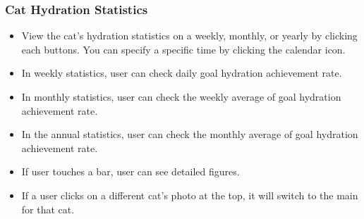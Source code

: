 \documentclass[conference]{IEEEtran}
\begin{document}
\subsubsection{Cat Hydration Statistics}
\begin{itemize}
    \begin{itemize}
        \item View the cat's hydration statistics on a weekly, monthly, or yearly by clicking each buttons. You can specify a specific time by clicking the calendar icon.
        \item In weekly statistics, user can check daily goal hydration  achievement rate.
        \item In monthly statistics, user can check the weekly average of goal hydration achievement rate.
        \item In the annual statistics, user can check the monthly average of goal hydration achievement rate.
        \item If user touches a bar, user can see detailed figures.
        \item If a user clicks on a different cat's photo at the top, it will switch to the main for that cat.
        \vspace{0.3cm} 
    \end{itemize}
\end{itemize}
\end{document}
